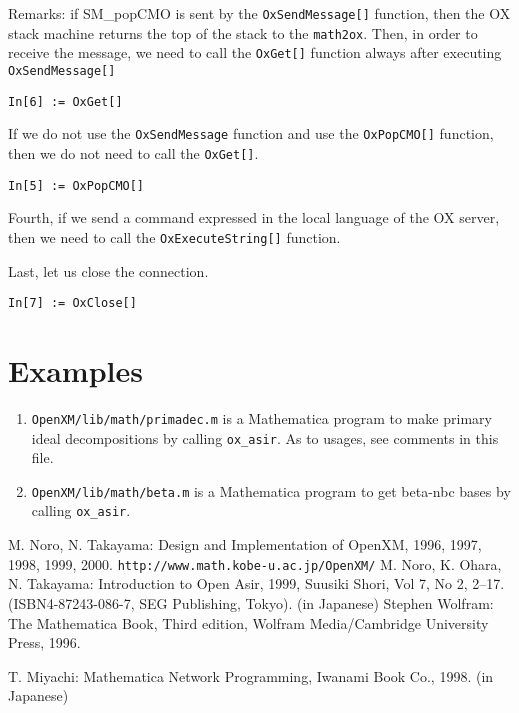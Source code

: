 \documentclass{article}
\begin{document}
Remarks: if SM\_popCMO is sent by the {\tt OxSendMessage[]} function, then the
OX stack machine returns the top of the stack to the {\tt math2ox}.
Then, in order to receive the message, we need to call the {\tt OxGet[]}
function always after executing {\tt OxSendMessage[]}
\begin{verbatim}
In[6] := OxGet[]
\end{verbatim}

If we do not use the {\tt OxSendMessage} function and use the {\tt OxPopCMO[]}
function, then we do not need to call the {\tt OxGet[]}.
\begin{verbatim}
In[5] := OxPopCMO[]
\end{verbatim}

Fourth, if we send a command expressed in the local language of the OX
server, then we need to call the {\tt OxExecuteString[]} function.

Last, let us close the connection.
\begin{verbatim}
In[7] := OxClose[]
\end{verbatim}

\section{Examples}

\begin{enumerate}
\item
{\tt OpenXM/lib/math/primadec.m} is a Mathematica program
to make primary ideal decompositions by calling
{\tt ox\_asir}.
As to usages, see comments in this file.
\item 
{\tt OpenXM/lib/math/beta.m} is a Mathematica program
to get beta-nbc bases by calling {\tt ox\_asir}.
\end{enumerate}



\appendix

\begin{thebibliography}{99}
M. Noro, N. Takayama:
Design and Implementation of OpenXM, 1996, 1997, 1998, 1999, 2000.
{\footnotesize {\tt http://www.math.kobe-u.ac.jp/OpenXM/}}
M. Noro, K. Ohara, N. Takayama:
{Introduction to Open Asir}, 1999, Suusiki Shori, Vol 7, No 2,
2--17. (ISBN4-87243-086-7, SEG Publishing, Tokyo). (in Japanese)
Stephen Wolfram:
{The Mathematica Book}, Third edition,
Wolfram Media/Cambridge University Press, 1996.

T. Miyachi:
{Mathematica Network Programming},
Iwanami Book Co., 1998. (in Japanese)
\end{thebibliography}
\end{document}
